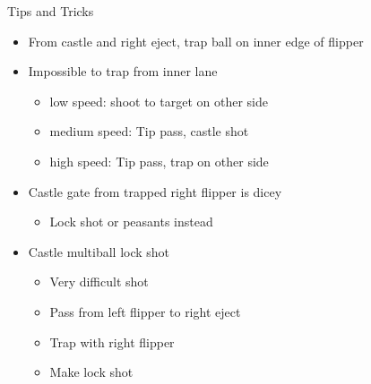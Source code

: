 \documentclass{beamer}
\begin{document}
\begin{frame}{Tips and Tricks}
\begin{itemize}
	\item From castle and right eject, trap ball on inner edge of flipper
	\item Impossible to trap from inner lane
	\begin{itemize}
		\item low speed: shoot to target on other side
		\item medium speed: Tip pass, castle shot
		\item high speed: Tip pass, trap on other side
	\end{itemize}
	\item Castle gate from trapped right flipper is dicey
	\begin{itemize}
		\item Lock shot or peasants instead
	\end{itemize}
	\item Castle multiball lock shot
	\begin{itemize}
		\item Very difficult shot
		\item Pass from left flipper to right eject
		\item Trap with right flipper
		\item Make lock shot
	\end{itemize}
\end{itemize}
\end{frame}
\end{document}
